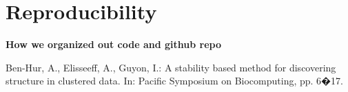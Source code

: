 \documentclass{article}\usepackage[]{graphicx}\usepackage[]{color}
\begin{document}
\section{Reproducibility}

{\bf How we organized out code and github repo}


 \begin{thebibliography}{1}

 Ben-Hur, A., Elisseeff, A., Guyon, I.: A stability based method for discovering structure in clustered data. In: Pacific Symposium on Biocomputing, pp. 6�17.   
\end{thebibliography}
\end{document}
